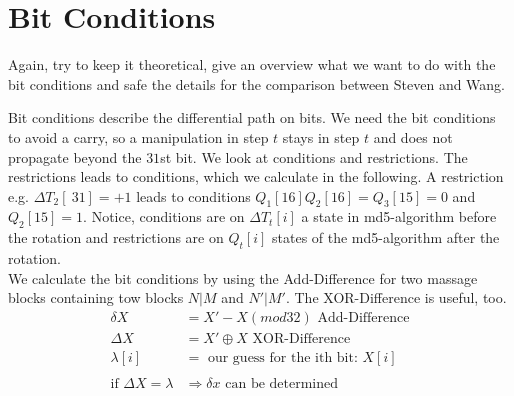 \section{Bit Conditions}

Again, try to keep it theoretical, give an overview what we want to do with the bit conditions and safe the details for the comparison between Steven and Wang.



Bit conditions describe the differential path on bits. 
We need the bit conditions to avoid a carry, so a manipulation in step $t$ stays in step $t$ and does not propagate beyond the $31$st bit.
We look at conditions and restrictions. The restrictions leads to conditions, which we calculate in the following.
A restriction e.g. $\Delta T_2 \left[\ 31 \right] = +1 $ leads to conditions $ Q_1\left[ 16 \right] Q_2\left[ 16 \right] = Q_3\left[ 15 \right] = 0 $ and $ Q_2[15] = 1$.
Notice, conditions are on $\Delta T_t[i]$ a state in md5-algorithm before the rotation and restrictions are on $Q_t[i]$ states of the md5-algorithm after the rotation.\\ 
We calculate the bit conditions by using the Add-Difference for two massage blocks containing tow blocks $N|M$ and $N'|M'$. The XOR-Difference is useful, too.
    \begin{align*}
        \delta X &= X' - X \left( mod32 \right) \text{ Add-Difference}\\
        \Delta X &= X' \oplus X \text{ XOR-Difference}\\
        \lambda \left[i\right] &= \text{ our guess for the ith bit: } X\left[i\right] \\
        \\
        \text{if } \Delta X = \lambda &\Rightarrow \delta x \text{ can be determined}
    \end{align*}

